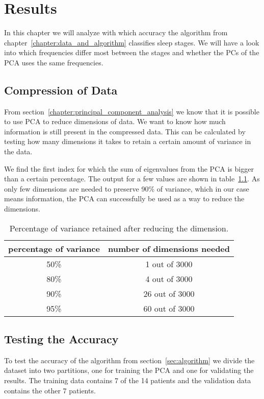\chapter{Results}
\label{chapter:results}

In this chapter we will analyze with which accuracy the algorithm from chapter~\ref{chapter:data_and_algorithm} classifies sleep stages. We will have a look into which frequencies differ most between the stages and whether the PCs of the PCA uses the same frequencies.

\section{Compression of Data}
From section~\ref{chapter:principal_component_analysis} we know that it is possible to use PCA to reduce dimensions of data. We want to know how much information is still present in the compressed data. This can be calculated by testing how many dimensions it takes to retain a certain amount of variance in the data.

We find the first index for which the sum of eigenvalues from the PCA is bigger than a certain percentage. The output for a few values are shown in table~\ref{tab:explained_variance}. As only few dimensions are needed to preserve 90\% of variance, which in our case means information, the PCA can successfully be used as a way to reduce the dimensions.

\begin{table}
	\centering
	\begin{tabular}{c|c}
		percentage of variance & number of dimensions needed \\
		\hline
		50\% & 1 out of 3000 \\
		80\% & 4 out of 3000 \\
		90\% & 26 out of 3000 \\
		95\% & 60 out of 3000 \\
	\end{tabular}
	\caption{Percentage of variance retained after reducing the dimension.}
	\label{tab:explained_variance}
\end{table}

\section{Testing the Accuracy}
To test the accuracy of the algorithm from section~\ref{sec:algorithm} we divide the dataset into two partitions, one for training the PCA and one for validating the results. The training data contains 7 of the 14 patients and the validation data contains the other 7 patients.

